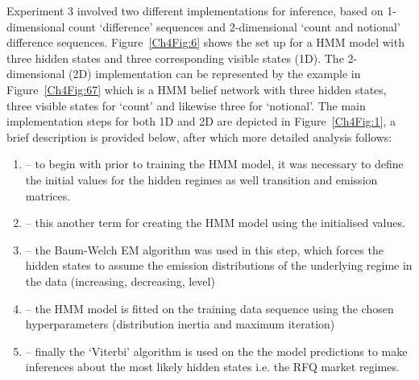 Experiment 3 involved two different implementations for inference, based on 1-dimensional count `difference' sequences and 2-dimensional `count and notional' difference sequences. Figure~\ref{Ch4Fig:6} shows the set up for a HMM model with three hidden states and three corresponding visible states (1D). The 2-dimensional (2D) implementation can be represented by the example in Figure~\ref{Ch4Fig:67} which is a HMM belief network with three hidden states, three visible states for `count' and likewise three for `notional'. The main implementation steps for both 1D and 2D are depicted in Figure~\ref{Ch4Fig:1}, a brief description is provided below, after which more detailed analysis follows:

\begin{enumerate}
    \item {} -- to begin with prior to training the HMM model, it was necessary to define the initial values for the hidden regimes as well transition and emission matrices.
    
    \item {} -- this another term for creating the HMM model using the initialised values.
    
    \item {} -- the Baum-Welch EM algorithm was used in this step, which forces the hidden states to assume the emission distributions of the underlying regime in the data (increasing, decreasing, level)
    \item {} -- the HMM model is fitted on the training data sequence using the chosen hyperparameters (distribution inertia and maximum iteration)
    \item {} -- finally the `Viterbi' algorithm is used on the the model predictions to make inferences about the most likely hidden states i.e. the RFQ market regimes.
    
\end{enumerate}  


